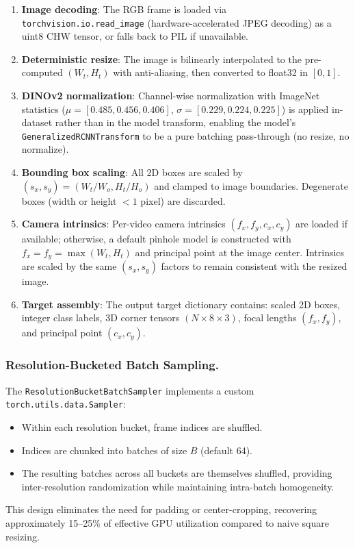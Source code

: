\documentclass[runningheads]{llncs}
\begin{document}
\begin{enumerate}
    \item \textbf{Image decoding}: The RGB frame is loaded via \texttt{torchvision.io.read\_image} (hardware-accelerated JPEG decoding) as a uint8 CHW tensor, or falls back to PIL if unavailable.
    
    \item \textbf{Deterministic resize}: The image is bilinearly interpolated to the pre-computed $(W_t, H_t)$ with anti-aliasing, then converted to float32 in $[0, 1]$.
    
    \item \textbf{DINOv2 normalization}: Channel-wise normalization with ImageNet statistics ($\mu = [0.485, 0.456, 0.406]$, $\sigma = [0.229, 0.224, 0.225]$) is applied in-dataset rather than in the model transform, enabling the model's \texttt{GeneralizedRCNNTransform} to be a pure batching pass-through (no resize, no normalize).
    
    \item \textbf{Bounding box scaling}: All 2D boxes are scaled by $(s_x, s_y) = (W_t / W_o, H_t / H_o)$ and clamped to image boundaries. Degenerate boxes (width or height $< 1$ pixel) are discarded.
    
    \item \textbf{Camera intrinsics}: Per-video camera intrinsics $(f_x, f_y, c_x, c_y)$ are loaded if available; otherwise, a default pinhole model is constructed with $f_x = f_y = \max(W_t, H_t)$ and principal point at the image center. Intrinsics are scaled by the same $(s_x, s_y)$ factors to remain consistent with the resized image.
    
    \item \textbf{Target assembly}: The output target dictionary contains: scaled 2D boxes, integer class labels, 3D corner tensors $(N \times 8 \times 3)$, focal lengths $(f_x, f_y)$, and principal point $(c_x, c_y)$.
\end{enumerate}

\subsubsection{Resolution-Bucketed Batch Sampling.}
The \texttt{ResolutionBucketBatchSampler} implements a custom \texttt{torch.utils.data.Sampler}:
\begin{itemize}
    \item Within each resolution bucket, frame indices are shuffled.
    \item Indices are chunked into batches of size $B$ (default 64).
    \item The resulting batches across all buckets are themselves shuffled, providing inter-resolution randomization while maintaining intra-batch homogeneity.
\end{itemize}
This design eliminates the need for padding or center-cropping, recovering approximately 15--25\% of effective GPU utilization compared to naive square resizing.
\end{document}
